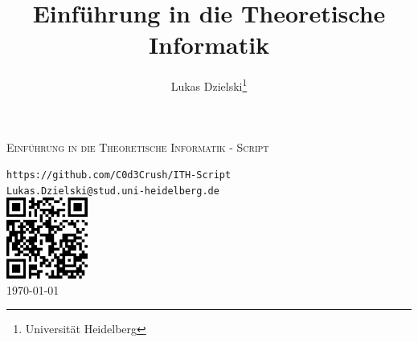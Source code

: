 \documentclass{article}
\begin{document}
\begin{titlepage}
  
    \centering
    \vspace*{2cm}
  
    \vspace{1cm}
  
    \textsc{\Large Einführung in die Theoretische Informatik - Script}\\[1.5cm]
    
    \title{Einführung in die Theoretische Informatik}
    \author{Lukas Dzielski\thanks{Universität Heidelberg}}
    
    \texttt{\large https://github.com/C0d3Crush/ITH-Script}\\
    \texttt{\large Lukas.Dzielski@stud.uni-heidelberg.de}\\[2cm]

    \includegraphics[width=0.2\textwidth]{qrcode.png}\\[10cm]

  
    {\large \today}\\[2cm]
  
    \vfill
  
\end{titlepage}
\newpage
\tableofcontents
\newpage





\end{document}
